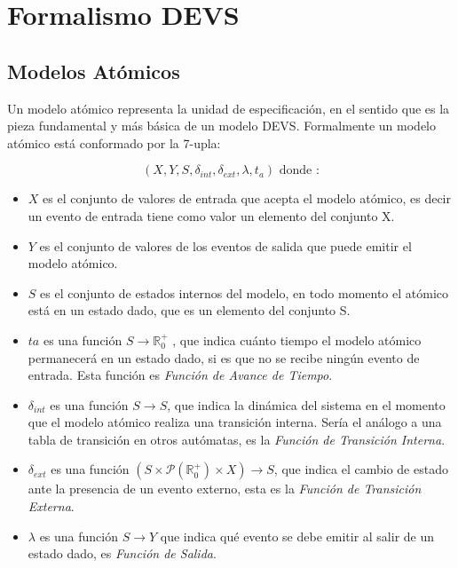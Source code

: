 \documentclass{beamer}
\begin{document}
\section{Formalismo DEVS}
\subsection{Modelos Atómicos}
\begin{frame}
Un modelo atómico representa la unidad  de especificación, en el sentido que es la pieza fundamental y más básica de un modelo DEVS. 
	Formalmente un modelo atómico está conformado por la 7-upla:

	\begin{equation} 
	(X, Y, S, \delta_{int} , \delta_{ext}, \lambda, t_{a}) \mbox{ donde :}
	\end{equation}

	\begin{itemize}
	\item $X$ es el conjunto de valores de entrada que acepta el modelo atómico, es decir un evento de entrada tiene como valor un elemento del conjunto X.
	\item $Y$ es el conjunto de valores de los eventos de salida que puede emitir el modelo atómico.
	\item $S$ es el conjunto de estados internos del modelo, en todo momento el atómico está en un estado dado, que es un elemento del conjunto S.
	\item $ta$ es una función $S \to \mathbb{R}^{+}_{0}$ , que indica cuánto tiempo el modelo atómico permanecerá en un estado dado, si es que no se recibe ningún 
	evento de entrada. Esta función es \emph{Función de Avance de Tiempo}.
	\item $\delta_{int}$ es una función $S \to S$, que indica la dinámica del sistema en el momento que el modelo atómico realiza una transición interna. 
	Sería el análogo a una tabla de transición en otros autómatas, es la \emph{Función de Transición Interna}.
	\item $\delta_{ext}$ es una función $(S \times \mathcal{P}(\mathbb{R}^{+}_{0}) \times X) \to S$, que indica el cambio de estado ante la presencia de un evento 
	externo, esta es la \emph{Función de Transición Externa}.
	\item $\lambda$ es una función $S \to Y$ que indica qué evento se debe emitir al salir de un estado dado, es \emph{Función de Salida}.
	\end{itemize}
\end{frame}
\end{document}
